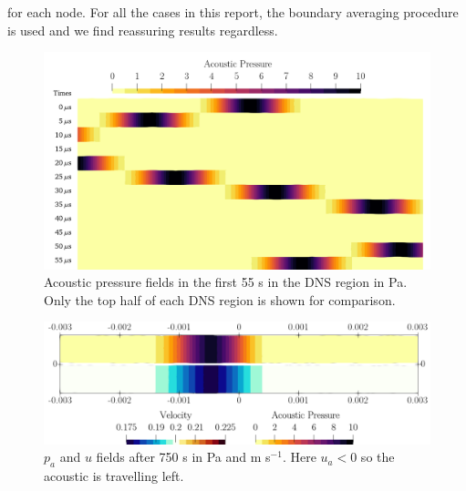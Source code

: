 for each node. For all the cases in this report, the boundary averaging procedure is used and we find reassuring results regardless.

\begin{figure}[t]
\centering
\includegraphics[scale=0.36]{assets/graphs/AC_BUMP_first_bounces_comp.png}
\caption{Acoustic pressure fields in the first 55 {\textmu}s in the DNS region in Pa. Only the top half of each DNS region is shown for comparison.}
\label{fig:ac-bump-dns}
\end{figure}

\begin{figure}[t]
\centering
\includegraphics[scale=0.36]{assets/graphs/AC_BUMP_ndt=150e-4_comp.png}
\caption{$p_a$ and $u$ fields after 750 {\textmu}s in Pa and m s$^{-1}$. Here $u_a < 0$ so the acoustic is travelling left.}
\label{fig:ac-bump-dns-late}
\end{figure}

